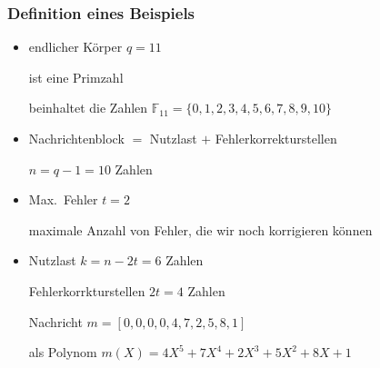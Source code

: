 \documentclass[11pt,aspectratio=169]{beamer}
\begin{document}
	\begin{frame}
		\frametitle{Definition eines Beispiels}
		
		\begin{itemize}
			
			\item endlicher Körper $q = 11$
			
			ist eine Primzahl

			beinhaltet die Zahlen $\mathbb{F}_{11} = \{0,1,2,3,4,5,6,7,8,9,10\}$
			
			\vspace{10pt}
			
			\item Nachrichtenblock $=$ Nutzlast $+$ Fehlerkorrekturstellen
			
			$n = q - 1 = 10$ Zahlen
			
			\vspace{10pt}
			
			\item Max.~Fehler $t = 2$
			
			maximale Anzahl von Fehler, die wir noch korrigieren können
			
			\vspace{10pt}
			
			\item Nutzlast $k = n -2t = 6$ Zahlen
			
			Fehlerkorrkturstellen $2t = 4$ Zahlen
			
			Nachricht $m = [0,0,0,0,4,7,2,5,8,1]$
			
			als Polynom $m(X) = 4X^5 + 7X^4 + 2X^3 + 5X^2 + 8X + 1$
			
		\end{itemize}
		
	\end{frame}
\end{document}
